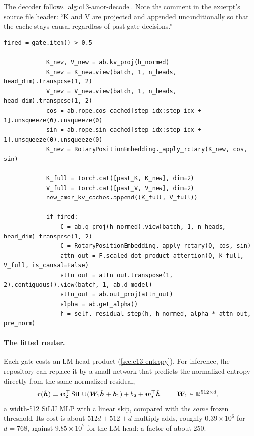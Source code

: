 The decoder follows \cref{alg:c13-amor-decode}. Note the comment in the excerpt's source file header:
``K and V are projected and appended unconditionally so that the cache stays causal regardless of
past gate decisions.''

\begin{lstlisting}[caption={Excerpt from \texttt{repos/HaoranZhengRaul\_\_AMOR/amor\_decode.py} (\texttt{decode\_step})},label={lst:c13-amor-decode}]
            fired = gate.item() > 0.5

            K_new, V_new = ab.kv_proj(h_normed)
            K_new = K_new.view(batch, 1, n_heads, head_dim).transpose(1, 2)
            V_new = V_new.view(batch, 1, n_heads, head_dim).transpose(1, 2)
            cos = ab.rope.cos_cached[step_idx:step_idx + 1].unsqueeze(0).unsqueeze(0)
            sin = ab.rope.sin_cached[step_idx:step_idx + 1].unsqueeze(0).unsqueeze(0)
            K_new = RotaryPositionEmbedding._apply_rotary(K_new, cos, sin)

            K_full = torch.cat([past_K, K_new], dim=2)
            V_full = torch.cat([past_V, V_new], dim=2)
            new_amor_kv_caches.append((K_full, V_full))

            if fired:
                Q = ab.q_proj(h_normed).view(batch, 1, n_heads, head_dim).transpose(1, 2)
                Q = RotaryPositionEmbedding._apply_rotary(Q, cos, sin)
                attn_out = F.scaled_dot_product_attention(Q, K_full, V_full, is_causal=False)
                attn_out = attn_out.transpose(1, 2).contiguous().view(batch, 1, ab.d_model)
                attn_out = ab.out_proj(attn_out)
                alpha = ab.get_alpha()
                h = self._residual_step(h, h_normed, alpha * attn_out, pre_norm)
\end{lstlisting}

\paragraph{The fitted router.}\label{sec:c13-amor-router} Each gate costs an LM-head product
(\cref{sec:c13-entropy}). For inference, the repository can replace it by a small network that predicts
the normalized entropy directly from the same normalized residual,
\begin{equation}\label{eq:c13-amor-router}
  r(\hat{\bm{h}}) = \bm{w}_2^{\top}\operatorname{SiLU}(\bm{W}_1\hat{\bm{h}}+\bm{b}_1)+b_2+\bm{w}_s^{\top}\hat{\bm{h}},\qquad \bm{W}_1\in\mathbb{R}^{512\times d},
\end{equation}
a width-512 SiLU MLP with a linear skip, compared with the \emph{same} frozen threshold. Its cost is
about $512d+512+d$ multiply-adds, roughly $0.39\times 10^6$ for $d=768$, against $9.85\times10^{7}$ for
the LM head: a factor of about $250$.

